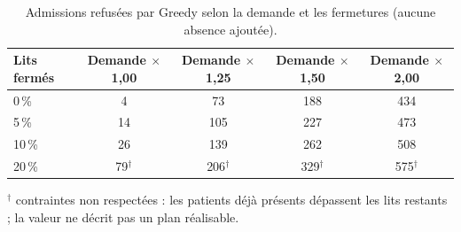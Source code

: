 \begin{table}[H]
    \centering
    \caption{Admissions refusées par Greedy selon la demande et les fermetures (aucune absence ajoutée).}
    \label{tab:sensibilite_refus}
    \small
    \begin{tabular}{lcccc}
        \toprule
        \textbf{Lits fermés} & \textbf{Demande $\times$1{,}00} & \textbf{Demande $\times$1{,}25} & \textbf{Demande $\times$1{,}50} & \textbf{Demande $\times$2{,}00} \\
        \midrule
        0\,\% & 4 & 73 & 188 & 434 \\
        5\,\% & 14 & 105 & 227 & 473 \\
        10\,\% & 26 & 139 & 262 & 508 \\
        20\,\% & 79$^{\dagger}$ & 206$^{\dagger}$ & 329$^{\dagger}$ & 575$^{\dagger}$ \\
        \bottomrule
    \end{tabular}
    \par\vspace{3pt}
    {\footnotesize $^{\dagger}$ contraintes non respectées : les patients déjà présents dépassent les lits restants ; la valeur ne décrit pas un plan réalisable.}
\end{table}
